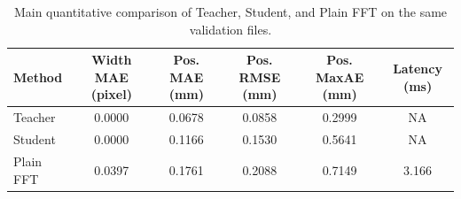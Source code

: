 \begin{table}[t]
\centering
\caption{Main quantitative comparison of Teacher, Student, and Plain FFT on the same validation files.}
\label{tab:main_quant}
\begin{tabular}{lccccc}
\hline
Method & Width MAE (pixel) & Pos. MAE (mm) & Pos. RMSE (mm) & Pos. MaxAE (mm) & Latency (ms) \\ 
\hline
Teacher & 0.0000 & 0.0678 & 0.0858 & 0.2999 & NA \\
Student & 0.0000 & 0.1166 & 0.1530 & 0.5641 & NA \\
Plain FFT & 0.0397 & 0.1761 & 0.2088 & 0.7149 & 3.166 \\
\hline
\end{tabular}
\end{table}
